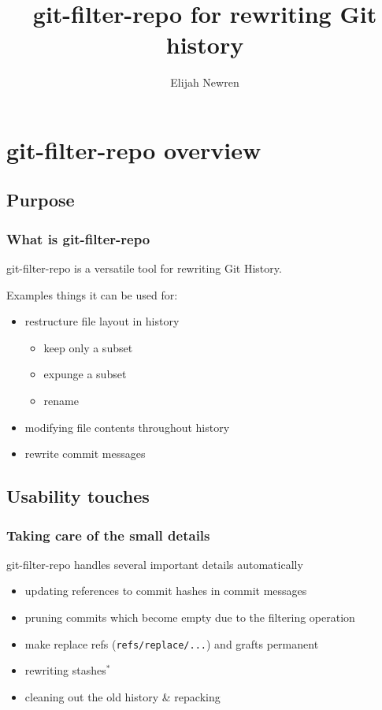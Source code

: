\documentclass[compress,t,aspectratio=169]{beamer}
\title{git-filter-repo for rewriting Git history}
\author{Elijah Newren}
\institute{GitHub}
\date{}
\begin{document}
\begin{frame}
  \titlepage
\end{frame}

\section[Introduction]{git-filter-repo overview}
\subsection{Purpose}

\begin{frame}
  \frametitle{What is git-filter-repo}

  git-filter-repo is a versatile tool for rewriting Git History.
  \vspace*{\baselineskip}

  \pause
  Examples things it can be used for:
  \begin{itemize}[<+->]
    \item restructure file layout in history
    \begin{itemize}
      \item keep only a subset
      \item expunge a subset
      \item rename
    \end{itemize}
    \item modifying file contents throughout history
    \item rewrite commit messages
  \end{itemize}

\end{frame}

\subsection{Usability touches}

\begin{frame}
  \frametitle{Taking care of the small details}

  git-filter-repo handles several important details automatically

  \begin{itemize}[<+->]
    \item updating references to commit hashes in commit messages
    \item pruning commits which become empty due to the filtering operation
    \item make replace refs (\texttt{refs/replace/...}) and grafts permanent
    \item rewriting stashes$^*$
    \item cleaning out the old history \& repacking
  \end{itemize}

\end{frame}
\end{document}
